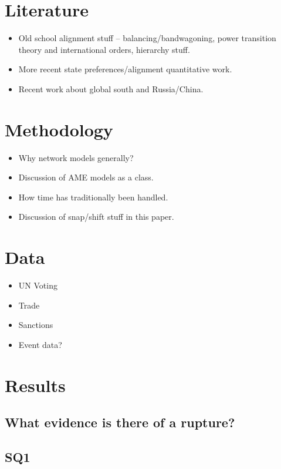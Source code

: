 \documentclass[12pt,a4paper]{article}
\begin{document}
\section{Literature}
\begin{itemize}
\item Old school alignment stuff -- balancing/bandwagoning, power transition theory and international orders, hierarchy stuff.
\item More recent state preferences/alignment quantitative work.
\item Recent work about global south and Russia/China.
\end{itemize}

\section{Methodology}
\begin{itemize}
\item Why network models generally?
\item Discussion of AME models as a class.
\item How time has traditionally been handled.
\item Discussion of snap/shift stuff in this paper.
\end{itemize}

\section{Data}
\begin{itemize}
\item UN Voting
\item Trade
\item Sanctions
\item Event data?
\end{itemize}

\section{Results}

\subsection{What evidence is there of a rupture?}

\subsection{SQ1}
\end{document}
